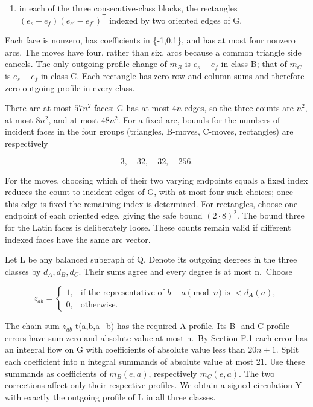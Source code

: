 \documentclass[english,11pt,a4paper]{article}
\providecommand{\tightlist}{\setlength{\itemsep}{0pt}\setlength{\parskip}{0pt}}
\begin{document}
\begin{enumerate}
\def\labelenumi{\arabic{enumi}.}
\setcounter{enumi}{2}
\tightlist
\item
  in each of the three consecutive-class blocks, the rectangles \((e_s-e_f)(e_{s\prime}-e_{f\prime})^{\mathsf T}\) indexed by two oriented edges of G.
\end{enumerate}

Each face is nonzero, has coefficients in \{-1,0,1\}, and has at most four nonzero arcs. The moves have four, rather than six, arcs because a common triangle side cancels. The only outgoing-profile change of \(m_{B}\) is \(e_{s}-e_{f}\) in class B; that of \(m_{C}\) is \(e_{s}-e_{f}\) in class C. Each rectangle has zero row and column sums and therefore zero outgoing profile in every class.

There are at most \(57n^{2}\) faces: G has at most \(4n\) edges, so the three counts are \(n^{2}\), at most \(8n^{2}\), and at most \(48n^{2}\). For a fixed arc, bounds for the numbers of incident faces in the four groups (triangles, B-moves, C-moves, rectangles) are respectively

\[3,\quad32,\quad32,\quad256.\tag{F.4}\]

For the moves, choosing which of their two varying endpoints equals a fixed index reduces the count to incident edges of G, with at most four such choices; once this edge is fixed the remaining index is determined. For rectangles, choose one endpoint of each oriented edge, giving the safe bound \((2\cdot 8)^{2}\). The bound three for the Latin faces is deliberately loose. These counts remain valid if different indexed faces have the same arc vector.

Let L be any balanced subgraph of Q. Denote its outgoing degrees in the three classes by \(d_{A},d_{B},d_{C}\). Their sums agree and every degree is at most n.~Choose

\[z_{ab}=\begin{cases}1,&\text{if the representative of }b-a\pmod n\text{ is }<d_A(a),\\0,&\text{otherwise.}\end{cases}\]

The chain sum \(z_{ab}\) t(a,b,a+b) has the required A-profile. Its B- and C-profile errors have sum zero and absolute value at most n.~By Section F.1 each error has an integral flow on G with coefficients of absolute value less than \(20n+1\). Split each coefficient into n integral summands of absolute value at most 21. Use these summands as coefficients of \(m_{B}(e,a)\), respectively \(m_{C}(e,a)\). The two corrections affect only their respective profiles. We obtain a signed circulation Y with exactly the outgoing profile of L in all three classes.
\end{document}
